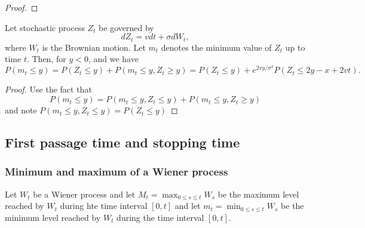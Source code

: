 \begin{refsection}
\begin{proof}
\end{proof}


\begin{lemma}\cite[213]{joshi2003concepts}
	Let stochastic process $Z_t$ be governed by 
	$$dZ_t = vdt + \sigma dW_t,$$
	where $W_t$ is the Brownian motion. Let $m_t$ denotes the minimum value of $Z_t$ up to time $t$. Then, for $y < 0$, and we have
	$$P(m_t \leq y) = P(Z_t \leq y) + P(m_t \leq y, Z_t\geq y) = P(Z_t \leq y) +  e^{2vy/\sigma^2}P(Z_t \leq 2y-x + 2vt).$$
\end{lemma}
\begin{proof}
	Use the fact that
	$$P(m_t \leq y) = P(m_t \leq y, Z_t \leq y) + P(m_t \leq y, Z_t\geq y)$$
	and note $P(m_t \leq y, Z_t \leq y) = P(Z_t \leq y)$
\end{proof}



\subsection{First passage time and stopping time}
\subsubsection{Minimum and maximum of a Wiener process}

\begin{lemma}\cite[88,214]{chin2017problems}
	Let $W_t$ be a Wiener process and let $M_t = \max_{0\leq s\leq t} W_s$ be the maximum level reached by $W_t$ during hte time interval $[0,t]$ and let $m_t = \min_{0\leq s\leq t} W_s$ be the minimum level reached by $W_t$ during the time interval $[0,t]$.
	

\end{lemma}
\end{refsection}
